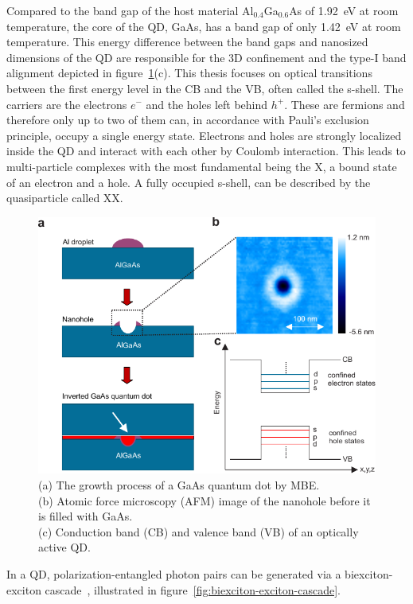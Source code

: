 Compared to the band gap of the host material Al$_{0.4}$Ga$_{0.6}$As of \SI{1.92}{\electronvolt} at room temperature, the core of the \ac{QD}, \ac{GaAs}, has a band gap of only \SI{1.42}{\electronvolt} at room temperature.
This energy difference between the band gaps and nanosized dimensions of the \ac{QD} are responsible for the 3D confinement and the type-I band alignment depicted in figure~\ref{fig:droplet-etched-gaas-qds}(c).
This thesis focuses on optical transitions between the first energy level in the \ac{CB} and the \ac{VB}, often called the s-shell.
The carriers are the electrons $e^-$ and the holes left behind $h^+$.
These are fermions and therefore only up to two of them can, in accordance with Pauli's exclusion principle, occupy a single energy state.
Electrons and holes are strongly localized inside the \ac{QD} and interact with each other by Coulomb interaction.
This leads to multi-particle complexes with the most fundamental being the \acf{X}, a bound state of an electron and a hole.
A fully occupied s-shell, can be described by the quasiparticle called \acf{XX}.
\begin{figure}[H]
	\centering
	\includegraphics[width=0.8\linewidth]{figures/quantum-dot/droplet-etched-gaas-qds}
	\caption[Droplet etched GaAs quantum dots.]{(a) The growth process of a GaAs quantum dot by \ac{MBE}.\\
	(b) Atomic force microscopy (AFM) image of the nanohole before it is filled with GaAs.\\
    (c) Conduction band (CB) and valence band (VB) of an optically active QD.~\cite{huber_gaas_2019}}
	\label{fig:droplet-etched-gaas-qds}
\end{figure}
In a \ac{QD}, polarization-entangled photon pairs can be generated via a biexciton-exciton cascade~\cite{stevenson_semiconductor_2006}, illustrated in figure~\ref{fig:biexciton-exciton-cascade}.
